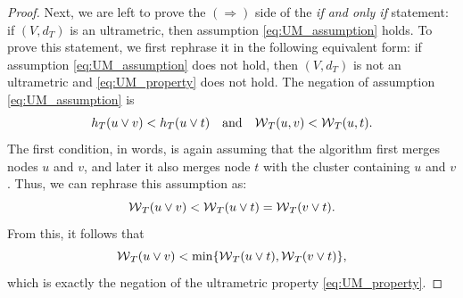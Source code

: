 \begin{proof}
Next, we are left to prove the $(\Rightarrow)$ side of the \emph{if and only if} statement: if $(V, d_{T})$ is an ultrametric, then assumption \ref{eq:UM_assumption} holds.
To prove this statement, we first rephrase it in the following equivalent form: if assumption \ref{eq:UM_assumption} does not hold, then $(V, d_{T})$ is not an ultrametric and \ref{eq:UM_property} does not hold. The negation of assumption \ref{eq:UM_assumption} is
\begin{equation}
h_T(u \vee v) < h_T(u \vee t) \quad \text{and} \quad  \mathcal{W}{}_{T}(u,v) < \mathcal{W}{}_{T}(u,t).
\end{equation}
The first condition, in words, is again assuming that the algorithm first merges nodes $u$ and $v$, and later it also merges node $t$ with the cluster containing $u$ and $v$. Thus, we can rephrase this assumption as:
\begin{equation}
\mathcal{W}{}_{T}(u \vee v) < \mathcal{W}{}_{T}(u \vee t) = \mathcal{W}{}_{T}(v \vee t).
\end{equation}
From this, it follows that
\begin{equation}
\mathcal{W}{}_{T}(u \vee v) < \min \{\mathcal{W}{}_{T}(u \vee t), \mathcal{W}{}_{T}(v \vee t)\},
\end{equation}
which is exactly the negation of the ultrametric property \ref{eq:UM_property}.
\end{proof}

